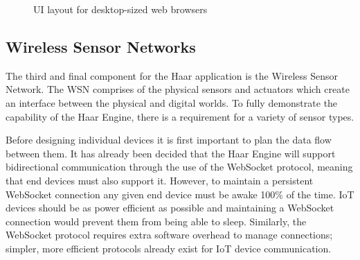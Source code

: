       \begin{figure}
        \centering
        \caption{UI layout for desktop-sized web browsers}\label{figure:desktop-layout}
      \end{figure}

    \subsection{Wireless Sensor Networks}
      The third and final component for the Haar application is the Wireless Sensor Network. The WSN comprises of the physical sensors and actuators which create an interface between the physical and digital worlds. To fully demonstrate the capability of the Haar Engine, there is a requirement for a variety of sensor types.

      Before designing individual devices it is first important to plan the data flow between them. It has already been decided that the Haar Engine will support bidirectional communication through the use of the WebSocket protocol, meaning that end devices must also support it. However, to maintain a persistent WebSocket connection any given end device must be awake 100\% of the time. IoT devices should be as power efficient as possible and maintaining a WebSocket connection would prevent them from being able to sleep. Similarly, the WebSocket protocol requires extra software overhead to manage connections; simpler, more efficient protocols already exist for IoT device communication.

